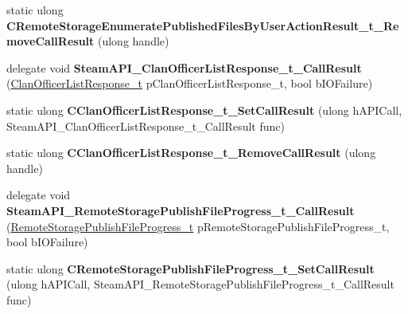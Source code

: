\begin{DoxyCompactItemize}
\mbox{\label{class_valve_1_1_interop_1_1_native_entrypoints_aa0fcd95329160897e599468c01a59a1d}} 
static ulong {\bfseries C\+Remote\+Storage\+Enumerate\+Published\+Files\+By\+User\+Action\+Result\+\_\+t\+\_\+\+Remove\+Call\+Result} (ulong handle)
\item 
\mbox{\label{class_valve_1_1_interop_1_1_native_entrypoints_a2f9940dc202a9d69167122ccecab93c9}} 
delegate void {\bfseries Steam\+A\+P\+I\+\_\+\+Clan\+Officer\+List\+Response\+\_\+t\+\_\+\+Call\+Result} (\hyperlink{struct_valve_1_1_steamworks_1_1_clan_officer_list_response__t}{Clan\+Officer\+List\+Response\+\_\+t} p\+Clan\+Officer\+List\+Response\+\_\+t, bool b\+I\+O\+Failure)
\item 
\mbox{\label{class_valve_1_1_interop_1_1_native_entrypoints_aed49d147760c75337c0ce633e108a5d7}} 
static ulong {\bfseries C\+Clan\+Officer\+List\+Response\+\_\+t\+\_\+\+Set\+Call\+Result} (ulong h\+A\+P\+I\+Call, Steam\+A\+P\+I\+\_\+\+Clan\+Officer\+List\+Response\+\_\+t\+\_\+\+Call\+Result func)
\item 
\mbox{\label{class_valve_1_1_interop_1_1_native_entrypoints_a3c6db07eeeaf43588dcff9a042520f1c}} 
static ulong {\bfseries C\+Clan\+Officer\+List\+Response\+\_\+t\+\_\+\+Remove\+Call\+Result} (ulong handle)
\item 
\mbox{\label{class_valve_1_1_interop_1_1_native_entrypoints_ac1de6dcbd9fcfcb31ca9ee8379177cf7}} 
delegate void {\bfseries Steam\+A\+P\+I\+\_\+\+Remote\+Storage\+Publish\+File\+Progress\+\_\+t\+\_\+\+Call\+Result} (\hyperlink{struct_valve_1_1_steamworks_1_1_remote_storage_publish_file_progress__t}{Remote\+Storage\+Publish\+File\+Progress\+\_\+t} p\+Remote\+Storage\+Publish\+File\+Progress\+\_\+t, bool b\+I\+O\+Failure)
\item 
\mbox{\label{class_valve_1_1_interop_1_1_native_entrypoints_a2b7058ea6fd64168332ed31b1d433754}} 
static ulong {\bfseries C\+Remote\+Storage\+Publish\+File\+Progress\+\_\+t\+\_\+\+Set\+Call\+Result} (ulong h\+A\+P\+I\+Call, Steam\+A\+P\+I\+\_\+\+Remote\+Storage\+Publish\+File\+Progress\+\_\+t\+\_\+\+Call\+Result func)

\end{DoxyCompactItemize}

